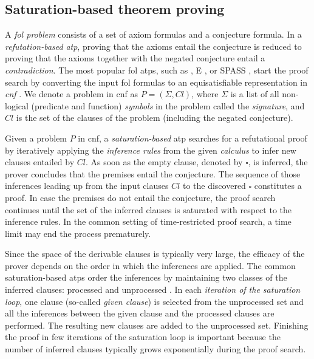 
\subsection{Saturation-based theorem proving}
\label{sec:saturation}

A \emph{\acrfull{fol} problem} consists of a set of axiom formulas and a conjecture formula.
In a \emph{refutation-based} \emph{\acrfull{atp}},
proving that the axioms entail the conjecture
is reduced to proving that the axioms together with the negated conjecture entail a \emph{contradiction}.
The most popular \gls{fol} \glspl{atp}, such as \Vampire{} \cite{DBLP:conf/cav/KovacsV13}, E \cite{Schulz2019}, or SPASS \cite{DBLP:conf/cade/WeidenbachDFKSW09},
start the proof search by converting the input \gls{fol} formulas to an equisatisfiable representation in 
\emph{\acrfull{cnf}} \cite{DBLP:books/el/RV01/NonnengartW01,Harrison2009}.
We denote a problem in \gls{cnf} as $P = (\Sigma, \mathit{Cl})$,
where $\Sigma$ is a list of all non-logical (predicate and function)
\emph{symbols} in the problem called the \emph{signature},
and $\mathit{Cl}$ is the set of the clauses of the problem (including the negated conjecture).

Given a problem $P$ in \gls{cnf},
a \emph{saturation-based} \gls{atp} searches for a refutational proof
by iteratively applying the \emph{inference rules} from the given \emph{calculus}
to infer new clauses entailed by $\mathit{Cl}$.
As soon as the empty clause, denoted by $\square$, is inferred,
the prover concludes that the premises entail the conjecture.
The sequence of those inferences leading up from the input clauses $\mathit{Cl}$ to the discovered $\square$ constitutes a proof.
In case the premises do not entail the conjecture,
the proof search continues until
the set of the inferred clauses is saturated with respect to the inference rules.
In the common setting of time-restricted proof search, a time limit may end the process prematurely.

Since the space of the derivable clauses is typically very large,
the efficacy of the prover depends on the order in which the inferences are applied.
The common saturation-based \glspl{atp} order the inferences
by maintaining two classes of the inferred clauses: processed and unprocessed \cite{Schulz2019}.
In each \emph{iteration of the saturation loop}, one clause (so-called \emph{given clause})
is selected from the unprocessed set
and all the inferences between the given clause and the processed clauses are performed.
The resulting new clauses are added to the unprocessed set.
Finishing the proof in few iterations of the saturation loop is important
because the number of inferred clauses typically grows exponentially during the proof search.

